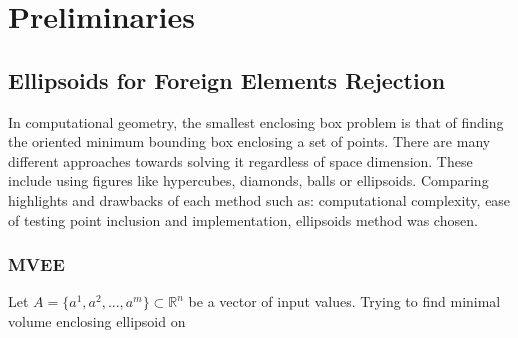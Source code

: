 \documentclass{llncs}
\begin{document}



\section{Preliminaries}
  \label{sec:preliminaries}



\subsection{Ellipsoids for Foreign Elements Rejection}


In computational geometry, the smallest enclosing box problem is that of finding the oriented minimum bounding box enclosing a set of points. There are many different approaches towards solving it regardless of space dimension. These include using figures like hypercubes, diamonds, balls or ellipsoids. Comparing highlights and drawbacks of each method such as: computational complexity, ease of testing point inclusion and implementation, ellipsoids method was chosen.


\subsubsection{MVEE}

Let $A = \{a^{1}, a^{2}, ..., a^{m}\} \subset \mathbb{R} ^{n}$ be a vector of input values. Trying to find minimal volume enclosing ellipsoid on 


\end{document}
